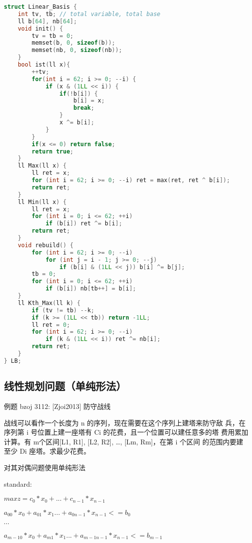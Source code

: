 \begin{lstlisting}[language=C++]
struct Linear_Basis {
    int tv, tb; // total variable, total base
    ll b[64], nb[64];
    void init() {
        tv = tb = 0;
        memset(b, 0, sizeof(b));
        memset(nb, 0, sizeof(nb));
    }
    bool ist(ll x){
        ++tv;
        for(int i = 62; i >= 0; --i) {
            if (x & (1LL << i)) {
                if(!b[i]) {
                    b[i] = x;
                    break;
                }
                x ^= b[i];
            }
        }
        if(x <= 0) return false;
        return true;
    }
    ll Max(ll x) {
        ll ret = x;
        for (int i = 62; i >= 0; --i) ret = max(ret, ret ^ b[i]);
        return ret;
    }
    ll Min(ll x) {
        ll ret = x;
        for (int i = 0; i <= 62; ++i)
            if (b[i]) ret ^= b[i];
        return ret;
    }
    void rebuild() {
        for (int i = 62; i >= 0; --i)
            for (int j = i - 1; j >= 0; --j)
                if (b[i] & (1LL << j)) b[i] ^= b[j];
        tb = 0;
        for (int i = 0; i <= 62; ++i)
            if (b[i]) nb[tb++] = b[i];
    }
    ll Kth_Max(ll k) {
        if (tv != tb) --k;
        if (k >= (1LL << tb)) return -1LL;
        ll ret = 0;
        for (int i = 62; i >= 0; --i)
            if (k & (1LL << i)) ret ^= nb[i];
        return ret;
    }
} LB;
\end{lstlisting}

\subsection{线性规划问题（单纯形法）}

例题 bzoj 3112: [Zjoi2013] 防守战线

战线可以看作一个长度为 n 的序列，现在需要在这个序列上建塔来防守敌
兵，在序列第 i 号位置上建一座塔有 Ci 的花费，且一个位置可以建任意多的塔
费用累加计算。有 m个区间[L1, R1], [L2, R2], …, [Lm, Rm]，在第 i 个区间
的范围内要建至少 Di 座塔。求最少花费。

对其对偶问题使用单纯形法

standard:

$max z = c_0*x_0 + ... + c_{n - 1}*x_{n - 1}$

$a_{0 0}*x_0 + a_{0 1}*x_1 ... + a_{0 n - 1}*x_{n - 1} <= b_0$

$\cdots$

$a_{m - 1 0}*x_0 + a_{m 1}*x_1 ... + a_{m - 1 n - 1}*x_{n - 1} <= b_{m - 1}$


